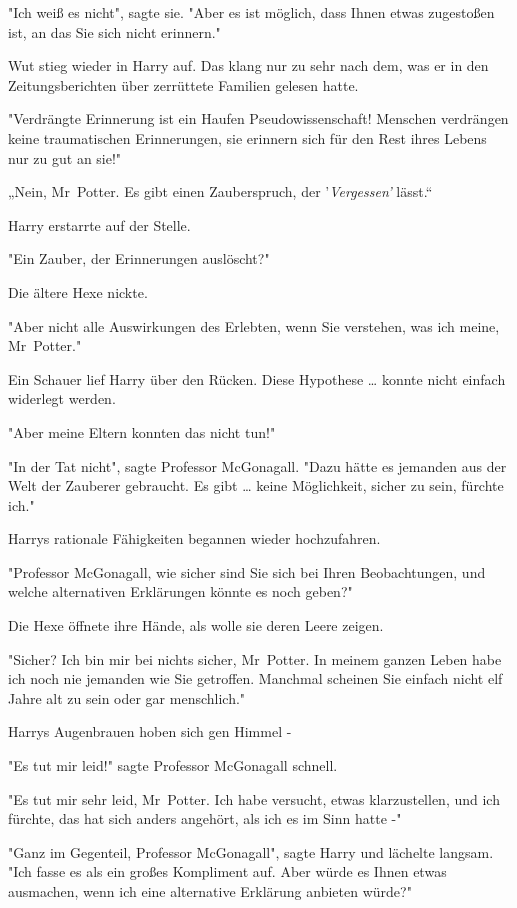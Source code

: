 {"Ich weiß es nicht", sagte sie. "Aber es ist möglich, dass Ihnen etwas zugestoßen ist, an das Sie sich nicht erinnern."

Wut stieg wieder in Harry auf. Das klang nur zu sehr nach dem, was er in den Zeitungsberichten über zerrüttete Familien gelesen hatte.

"Verdrängte Erinnerung ist ein Haufen Pseudowissenschaft! Menschen verdrängen keine traumatischen Erinnerungen, sie erinnern sich für den Rest ihres Lebens nur zu gut an sie!"

„Nein, Mr~Potter. Es gibt einen Zauberspruch, der '\emph{Vergessen'} lässt.“

Harry erstarrte auf der Stelle.

"Ein Zauber, der Erinnerungen auslöscht?"

Die ältere Hexe nickte.

"Aber nicht alle Auswirkungen des Erlebten, wenn Sie verstehen, was ich meine, Mr~Potter."

Ein Schauer lief Harry über den Rücken. Diese Hypothese … konnte nicht einfach widerlegt werden.

"Aber meine Eltern konnten das nicht tun!"

"In der Tat nicht", sagte Professor McGonagall. "Dazu hätte es jemanden aus der Welt der Zauberer gebraucht. Es gibt … keine Möglichkeit, sicher zu sein, fürchte ich."

Harrys rationale Fähigkeiten begannen wieder hochzufahren.

"Professor McGonagall, wie sicher sind Sie sich bei Ihren Beobachtungen, und welche alternativen Erklärungen könnte es noch geben?"

Die Hexe öffnete ihre Hände, als wolle sie deren Leere zeigen.

"Sicher? Ich bin mir bei nichts sicher, Mr~Potter. In meinem ganzen Leben habe ich noch nie jemanden wie Sie getroffen. Manchmal scheinen Sie einfach nicht elf Jahre alt zu sein oder gar menschlich."

Harrys Augenbrauen hoben sich gen Himmel -

"Es tut mir leid!" sagte Professor McGonagall schnell.

"Es tut mir sehr leid, Mr~Potter. Ich habe versucht, etwas klarzustellen, und ich fürchte, das hat sich anders angehört, als ich es im Sinn hatte -"

"Ganz im Gegenteil, Professor McGonagall", sagte Harry und lächelte langsam. "Ich fasse es als ein großes Kompliment auf. Aber würde es Ihnen etwas ausmachen, wenn ich eine alternative Erklärung anbieten würde?"

}
